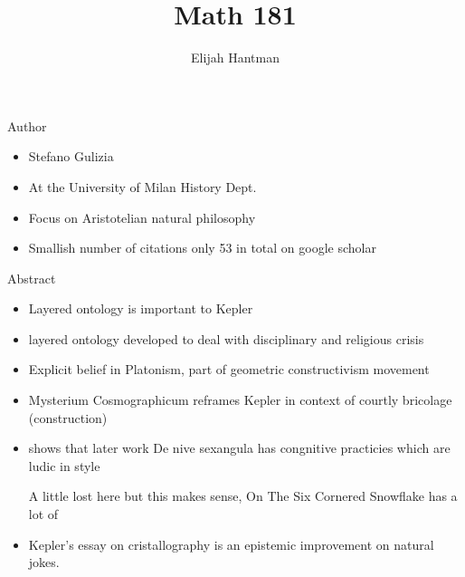 \documentclass{report}
\title{\Huge{Math 181}}
\author{\huge{Elijah Hantman}}
\date{}
\begin{document}
\maketitle
\newpage

{\large Author}
\begin{itemize}
    \item Stefano Gulizia
    \item At the University of Milan History Dept.
    \item Focus on Aristotelian natural philosophy
    \item Smallish number of citations only 53 in total
        on google scholar
\end{itemize}

{\large Abstract}
\begin{itemize}
    \item Layered ontology is important to Kepler
    \item layered ontology developed to deal with
        disciplinary and religious crisis
    \item Explicit belief in Platonism, part of
        geometric constructivism movement
    \item Mysterium Cosmographicum reframes Kepler
        in context of courtly bricolage (construction)
    \item shows that later work De nive sexangula has
        congnitive practicies which are ludic in style
        \begin{mdframed}
            A little lost here but this makes sense,
            On The Six Cornered Snowflake has a lot of
        \end{mdframed}
    \item Kepler's essay on cristallography is an
        epistemic improvement on natural jokes.
\end{itemize}
\end{document}

